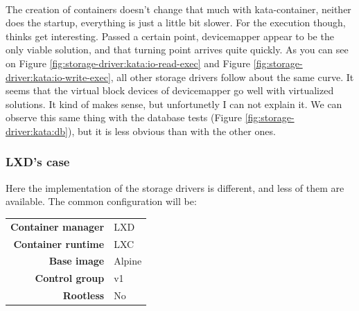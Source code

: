 \paragraph{}The creation of containers doesn't change that much with kata-container, neither does the startup, everything is just a little bit slower.  For the execution though, thinks get interesting.  Passed a certain point, devicemapper appear to be the only viable solution, and that turning point arrives quite quickly.  As you can see on Figure \ref{fig:storage-driver:kata:io-read-exec} and Figure \ref{fig:storage-driver:kata:io-write-exec}, all other storage drivers follow about the same curve.  It seems that the virtual block devices of devicemapper go well with virtualized solutions.  It kind of makes sense, but unfortunetly I can not explain it.  We can observe this same thing with the database tests (Figure \ref{fig:storage-driver:kata:db}), but it is less obvious than with the other ones.

\clearpage
\subsubsection{LXD's case}
Here the implementation of the storage drivers is different, and less of them are available.  The common configuration will be:

\begin{tabular}{rl}
   \textbf{Container manager} & LXD \\
   \textbf{Container runtime} & LXC \\
   \textbf{Base image} & Alpine \\
   \textbf{Control group} & v1 \\
   \textbf{Rootless} & No 
\end{tabular}


